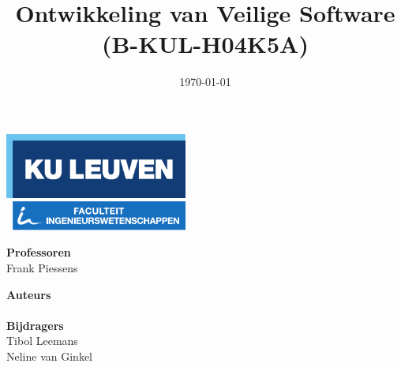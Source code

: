 \documentclass[11pt]{book}
\title{Ontwikkeling van Veilige Software \\ (B-KUL-H04K5A)}
\date{\today}
\author{\theauthors}
\newcommand{\thecontributors}{Tibol Leemans \\ Neline van Ginkel}
\newcommand{\theprofs}{Frank Piessens}
\theoremstyle{definition}
\begin{document}
\frontmatter

\begin{titlepage}

\thispagestyle{empty}

\begin{minipage}{\textwidth}
	\includegraphics[width=60mm]{logokuleng.pdf}
\end{minipage}

\vspace{40mm}

\begin{minipage}{\textwidth}
	\Huge
	\sffamily
	\thetitle
\end{minipage}

\vspace{50mm}

\hfill
\begin{minipage}[t]{0.5\textwidth}
	\Large
	\sffamily
	\textbf{Professoren} \\
	\theprofs
\end{minipage}%
\begin{minipage}[t]{0.5\textwidth}
\begin{flushright}
	\Large
	\sffamily
	\textbf{Auteurs} \\
	\theauthor
	\vspace{10mm} \\
	\textbf{Bijdragers} \\
	\thecontributors
\end{flushright}
\end{minipage}
\vfill
\end{titlepage}

\tableofcontents

\newpage


\mainmatter







\appendix



\nocite{*}
\end{document}
